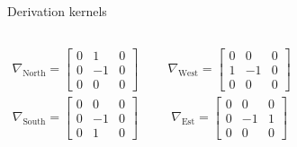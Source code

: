 \begin{frame}{Derivation kernels}
\begin{columns}

\centering
\begin{align*}
    \nabla_\text{North} = \begin{bmatrix} 0 & 1 & 0 \\ 0 & -1 & 0 \\ 0 & 0 & 0 \end{bmatrix}
\end{align*}
\begin{align*}
    \nabla_\text{South} = \begin{bmatrix} 0 & 0 & 0 \\ 0 & -1 & 0 \\ 0 & 1 & 0 \end{bmatrix}
\end{align*}

\centering
\begin{align*}
    \nabla_\text{West} = \begin{bmatrix} 0 & 0 & 0 \\ 1 & -1 & 0 \\ 0 & 0 & 0 \end{bmatrix}
\end{align*}
\begin{align*}
    \nabla_\text{Est} = \begin{bmatrix} 0 & 0 & 0 \\ 0 & -1 & 1 \\ 0 & 0 & 0 \end{bmatrix}
\end{align*}
\end{columns}

\end{frame}

